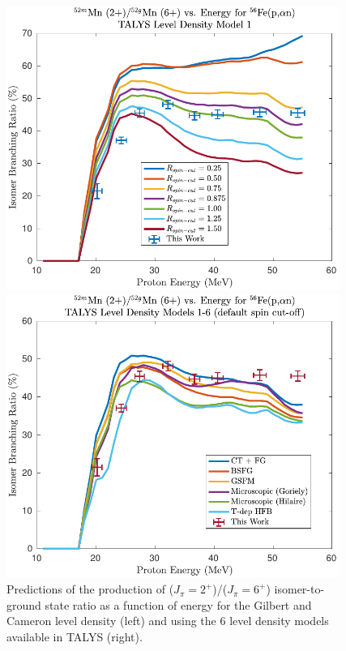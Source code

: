 \documentclass[letterpaper]{ar-1col}
\begin{document}
\begin{figure}
    \centering
    \begin{minipage}{0.5\textwidth}
        \centering
        \includegraphics[width=0.97\textwidth]{isomer_curves.pdf} %
    \end{minipage}\hfill
    \begin{minipage}{0.5\textwidth}
        \centering
        \includegraphics[width=0.97\textwidth]{ldmodels.pdf} %
    \end{minipage}
    \caption{Predictions of the production of ($J_\pi=2^+$)/($J_\pi=6^+$) isomer-to-ground state ratio as a function of energy for the Gilbert and Cameron level density (left) and using the 6 level density models available in TALYS (right). }
     \label{fig:fe_isomer_plots}
\end{figure}
\end{document}
